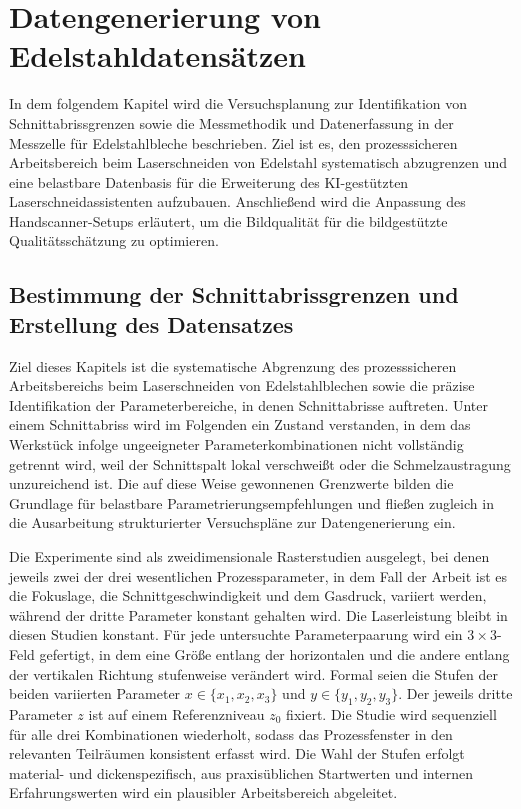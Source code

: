 \chapter{Datengenerierung von Edelstahldatensätzen}

In dem folgendem Kapitel wird die Versuchsplanung zur Identifikation von Schnittabrissgrenzen sowie die Messmethodik und Datenerfassung in der Messzelle für Edelstahlbleche beschrieben. Ziel ist es, den prozesssicheren Arbeitsbereich beim Laserschneiden von Edelstahl systematisch abzugrenzen und eine belastbare Datenbasis für die Erweiterung des KI-gestützten Laserschneidassistenten aufzubauen. Anschließend wird die Anpassung des Handscanner-Setups erläutert, um die Bildqualität für die bildgestützte Qualitätsschätzung zu optimieren.

\section{Bestimmung der Schnittabrissgrenzen und Erstellung des Datensatzes}
Ziel dieses Kapitels ist die systematische Abgrenzung des prozesssicheren Arbeitsbereichs beim Laserschneiden von Edelstahlblechen sowie die präzise Identifikation der Parameterbereiche, in denen Schnittabrisse auftreten. Unter einem Schnittabriss wird im Folgenden ein Zustand verstanden, in dem das Werkstück infolge ungeeigneter Parameterkombinationen nicht vollständig getrennt wird, weil der Schnittspalt lokal verschweißt oder die Schmelzaustragung unzureichend ist. Die auf diese Weise gewonnenen Grenzwerte bilden die Grundlage für belastbare Parametrierungsempfehlungen und fließen zugleich in die Ausarbeitung strukturierter Versuchspläne zur Datengenerierung ein.

Die Experimente sind als zweidimensionale Rasterstudien ausgelegt, bei denen jeweils zwei der drei wesentlichen Prozessparameter, in dem Fall der Arbeit ist es die Fokuslage, die Schnittgeschwindigkeit und dem Gasdruck, variiert werden, während der dritte Parameter konstant gehalten wird. Die Laserleistung bleibt in diesen Studien konstant. Für jede untersuchte Parameterpaarung wird ein $3\times 3$-Feld gefertigt, in dem eine Größe entlang der horizontalen und die andere entlang der vertikalen Richtung stufenweise verändert wird. Formal seien die Stufen der beiden variierten Parameter $x\in\{x_1,x_2,x_3\}$ und $y\in\{y_1,y_2,y_3\}$. Der jeweils dritte Parameter $z$ ist auf einem Referenzniveau $z_0$ fixiert. Die Studie wird sequenziell für alle drei Kombinationen wiederholt, sodass das Prozessfenster in den relevanten Teilräumen konsistent erfasst wird. Die Wahl der Stufen erfolgt material- und dickenspezifisch, aus praxisüblichen Startwerten und internen Erfahrungswerten wird ein plausibler Arbeitsbereich abgeleitet.

